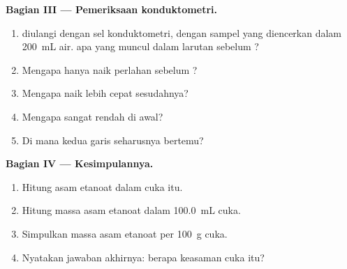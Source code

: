 \begin{problem}
\medskip
\noindent\textbf{Bagian III --- Pemeriksaan konduktometri.}
\begin{enumerate}[resume]
  \item {} diulangi dengan sel konduktometri, dengan sampel yang
        diencerkan dalam \qty{200}{mL} air.  apa yang muncul dalam
        larutan sebelum ?
  \item Mengapa  hanya naik perlahan sebelum ?
  \item Mengapa  naik lebih cepat sesudahnya?
  \item Mengapa  sangat rendah di awal?
  \item Di mana kedua garis seharusnya bertemu?
\end{enumerate}

\medskip
\noindent\textbf{Bagian IV --- Kesimpulannya.}
\begin{enumerate}[resume]
  \item Hitung  asam etanoat dalam cuka itu.
  \item Hitung massa asam etanoat dalam \qty{100.0}{mL} cuka.
  \item Simpulkan massa asam etanoat per \qty{100}{g} cuka.
  \item Nyatakan jawaban akhirnya: berapa keasaman cuka itu?
\end{enumerate}
\end{problem}
